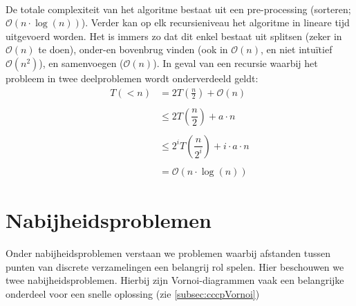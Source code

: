 \documentclass[a4paper,titlepage]{article}
\newcommand{\brak}[1]{\left(#1\right)}
\newcommand{\bigoh}[1]{\ensuremath{\mathcal{O}\left(#1\right)}}
\begin{document}
\paragraph{}
De totale complexiteit van het algoritme bestaat uit een pre-processing (sorteren; \bigoh{n\cdot\log\brak{n}}). Verder kan op elk recursieniveau het algoritme in lineare tijd uitgevoerd worden. Het is immers zo dat dit enkel bestaat uit splitsen (zeker in \bigoh{n} te doen), onder-en bovenbrug vinden (ook in \bigoh{n}, en niet intu\"itief \bigoh{n^2}), en samenvoegen (\bigoh{n}). In geval van een recursie waarbij het probleem in twee deelproblemen wordt onderverdeeld geldt:
\begin{equation}
\begin{array}{rl}
T\brak{<n}&=2T\brak{\displaystyle\frac{n}{2}}+\bigoh{n}\\
&\\
&\leq2T\brak{\dfrac{n}{2}}+a\cdot n\\
&\\
&\leq2^iT\brak{\dfrac{n}{2^i}}+i\cdot a\cdot n\\
&\\
&=\bigoh{n\cdot\log\brak{n}}
\end{array}
\end{equation}
\newpage
\section{Nabijheidsproblemen}
Onder nabijheidsproblemen verstaan we problemen waarbij afstanden tussen punten van discrete verzamelingen een belangrij rol spelen. Hier beschouwen we twee nabijheidsproblemen. Hierbij zijn Vornoi-diagrammen vaak een belangrijke onderdeel voor een snelle oplossing (zie \ref{subsec:cccpVornoi})
\end{document}
